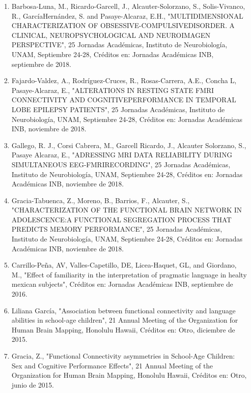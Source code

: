 \begin{enumerate}
\item Barbosa-Luna, M., Ricardo-Garcell, J., Alcauter-Solorzano, S., Solis-Vivanco, R., GarcíaHernández, S. and Pasaye-Alcaraz, E.H., "MULTIDIMENSIONAL 
CHARACTERIZATION OF OBSESSIVE-COMPULSIVEDISORDER. A CLINICAL, NEUROPSYCHOLOGICAL AND NEUROIMAGEN PERSPECTIVE", 25 Jornadas Académicas, Instituto de 
Neurobiología, UNAM, Septiembre 24-28, Créditos en: Jornadas Académicas INB, septiembre de 2018.

\item Fajardo-Valdez, A., Rodríguez-Cruces, R., Rosas-Carrera, A.E., Concha L, Pasaye-Alcaraz, E., "ALTERATIONS IN RESTING STATE FMRI CONNECTIVITY AND 
COGNITIVEPERFORMANCE IN TEMPORAL LOBE EPILEPSY PATIENTS", 25 Jornadas Académicas, Instituto de Neurobiología, UNAM, Septiembre 24-28, Créditos en: Jornadas 
Académicas INB, noviembre de 2018.

\item Gallego, R. J., Corsi Cabrera, M., Garcell Ricardo, J., Alcauter Solorzano, S., Pasaye Alcaraz, E., "ADRESSING MRI DATA RELIABILITY DURING SIMULTANEOUS 
EEG-FMRIRECORDING", 25 Jornadas Académicas, Instituto de Neurobiología, UNAM, Septiembre 24-28, Créditos en: Jornadas Académicas INB, noviembre de 2018.

\item Gracia-Tabuenca, Z., Moreno, B., Barrios, F., Alcauter, S., "CHARACTERIZATION OF THE FUNCTIONAL BRAIN NETWORK IN ADOLESCENCE:A FUNCTIONAL SEGREGATION 
PROCESS 
THAT PREDICTS MEMORY PERFORMANCE", 25 Jornadas Académicas, Instituto de Neurobiología, UNAM, Septiembre 24-28, Créditos en: Jornadas Académicas INB, noviembre de 
2018.

\item Carrillo-Peña, AV, Valles-Capetillo, DE, Licea-Haquet, GL, and Giordano, M., "Effect of familiarity in the interpretation of pragmatic language in healty 
mexican 
subjects", Créditos en: Jornadas Académicas INB, septiembre de 2016.

\item Liliana García, "Association between functional connectivity and language abilities in school-age children", 21 Annual Meeting of the Organization for 
Human 
Brain Mapping, Honolulu Hawaii, Créditos en: Otro, diciembre de 2015.

\item Gracia, Z., "Functional Connectivity asymmetries in School-Age Children: Sex and Cognitive Performance Effects", 21 Annual Meeting of the Organization for 
Human 
Brain Mapping, Honolulu Hawaii, Créditos en: Otro, junio de 2015.


\end{enumerate}
